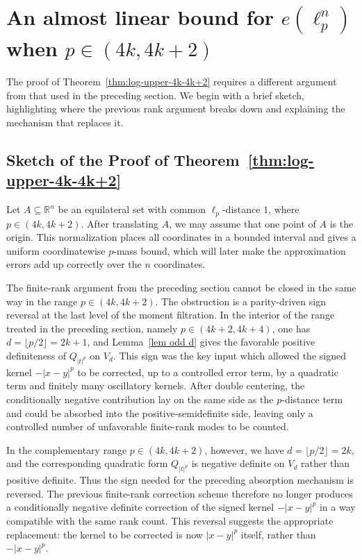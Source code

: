 \documentclass[11pt]{article}
\theoremstyle{definition}
\begin{document}
\section{An almost linear bound for \(e(\ell_{p}^{n})\) when \(p\in(4k,4k+2)\)}
The proof of Theorem~\ref{thm:log-upper-4k-4k+2} requires a different argument from that used in the preceding section. 
We begin with a brief sketch, highlighting where the previous rank argument breaks down and explaining the mechanism that replaces it.

\subsection{Sketch of the Proof of Theorem~\ref{thm:log-upper-4k-4k+2}}
Let \(A\subseteq\mathbb R^n\) be an equilateral set with common \(\ell_p\)-distance
\(1\), where \(p\in(4k,4k+2)\).  After translating \(A\), we may assume that one
point of \(A\) is the origin.  This normalization places all coordinates in a bounded
interval and gives a uniform coordinatewise \(p\)-mass bound, which will later make
the approximation errors add up correctly over the \(n\) coordinates.


The finite-rank argument from the preceding section cannot be closed in the
same way in the range \(p\in(4k,4k+2)\). The obstruction is a parity-driven
sign reversal at the last level of the moment filtration. In the interior of
the range treated in the preceding section, namely \(p\in(4k+2,4k+4)\), one has
\(d=\lfloor p/2\rfloor=2k+1\), and Lemma~\ref{lem odd d} gives the favorable
positive definiteness of \(Q_{|t|^p}\) on \(V_d\). This sign was the key input
which allowed the signed kernel \(-|x-y|^p\) to be corrected, up to a controlled
error term, by a quadratic term and finitely many oscillatory kernels. After
double centering, the conditionally negative contribution lay on the same side
as the \(p\)-distance term and could be absorbed into the
positive-semidefinite side, leaving only a controlled number of unfavorable
finite-rank modes to be counted.

In the complementary range \(p\in(4k,4k+2)\), however, we have
\(d=\lfloor p/2\rfloor=2k\), and the corresponding quadratic form
\(Q_{|t|^p}\) is negative definite on \(V_d\) rather than positive definite.
Thus the sign needed for the preceding absorption mechanism is reversed. The
previous finite-rank correction scheme therefore no longer produces a
conditionally negative definite correction of the signed kernel \(-|x-y|^p\)
in a way compatible with the same rank count. This reversal suggests the
appropriate replacement: the kernel to be corrected is now \(|x-y|^p\) itself,
rather than \(-|x-y|^p\).
\end{document}
